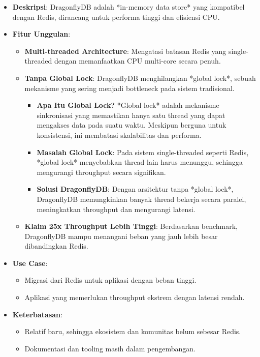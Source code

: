 \documentclass[11pt, a4paper]{book}
\begin{document}
	\begin{itemize}
		\item \textbf{Deskripsi}:  
		DragonflyDB adalah *in-memory data store* yang kompatibel dengan Redis, dirancang untuk performa tinggi dan efisiensi CPU.
		
		\item \textbf{Fitur Unggulan}:
		\begin{itemize}
			\item \textbf{Multi-threaded Architecture}:  
			Mengatasi batasan Redis yang single-threaded dengan memanfaatkan CPU multi-core secara penuh.
			
			\item \textbf{Tanpa Global Lock}:  
			DragonflyDB menghilangkan *global lock*, sebuah mekanisme yang sering menjadi bottleneck pada sistem tradisional.  
			\begin{itemize}
				\item \textbf{Apa Itu Global Lock?}  
				*Global lock* adalah mekanisme sinkronisasi yang memastikan hanya satu thread yang dapat mengakses data pada suatu waktu. Meskipun berguna untuk konsistensi, ini membatasi skalabilitas dan performa.
				\item \textbf{Masalah Global Lock}:  
				Pada sistem single-threaded seperti Redis, *global lock* menyebabkan thread lain harus menunggu, sehingga mengurangi throughput secara signifikan.
				\item \textbf{Solusi DragonflyDB}:  
				Dengan arsitektur tanpa *global lock*, DragonflyDB memungkinkan banyak thread bekerja secara paralel, meningkatkan throughput dan mengurangi latensi.
			\end{itemize}
			
			\item \textbf{Klaim 25x Throughput Lebih Tinggi}:  
			Berdasarkan benchmark, DragonflyDB mampu menangani beban yang jauh lebih besar dibandingkan Redis.
		\end{itemize}
		
		\item \textbf{Use Case}:
		\begin{itemize}
			\item Migrasi dari Redis untuk aplikasi dengan beban tinggi.
			\item Aplikasi yang memerlukan throughput ekstrem dengan latensi rendah.
		\end{itemize}
		
		\item \textbf{Keterbatasan}:
		\begin{itemize}
			\item Relatif baru, sehingga ekosistem dan komunitas belum sebesar Redis.
			\item Dokumentasi dan tooling masih dalam pengembangan.
		\end{itemize}
	\end{itemize}
	
\end{document}
